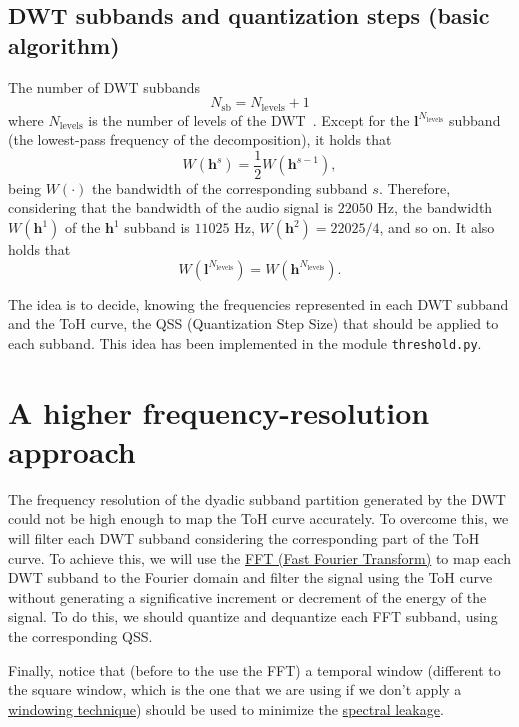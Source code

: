\subsection{DWT subbands and quantization steps (basic algorithm)}
The number of DWT subbands
\begin{equation}
  N_{\text{sb}} = N_{\text{levels}} + 1
\end{equation}
where $N_{\text{levels}}$ is the number of levels of the
DWT~\cite{vetterli1995wavelets}. Except for the
${\mathbf l}^{N_{\text{levels}}}$ subband (the lowest-pass frequency
of the decomposition), it holds that
\begin{equation}
  W({\mathbf h}^s) = \frac{1}{2}W({\mathbf h}^{s-1}),
\end{equation}
being $W(\cdot)$ the bandwidth of the corresponding
subband $s$. Therefore, considering that the bandwidth of the audio signal
is $22050$ Hz, the bandwidth $W({\mathbf h}^1)$ of the ${\mathbf h}^1$ subband is $11025$ Hz,
$W({\mathbf h} ^2)=22025/4$, and so on. It also holds that
\begin{equation}
  W({\mathbf l}^{N_{\text{levels}}}) = W({\mathbf h}^{N_{\text{levels}}}).
\end{equation}

The idea is to decide, knowing the frequencies represented in each DWT
subband and the ToH curve, the QSS (Quantization Step Size) that should be
applied to each subband. This idea has been implemented in the module
\verb|threshold.py|.

\section{A higher frequency-resolution approach}

The frequency resolution of the dyadic subband partition generated by
the DWT could not be high enough to map the ToH curve accurately. To
overcome this, we will filter each DWT subband considering the
corresponding part of the ToH curve. To achieve this, we will use the
\href{https://numpy.org/doc/stable/reference/routines.fft.html}{FFT
  (Fast Fourier Transform)} to map each DWT subband to the Fourier
domain and filter the signal using the ToH curve without generating a
significative increment or decrement of the energy of the signal. To
do this, we should quantize and dequantize each FFT subband, using the
corresponding QSS.

Finally, notice that (before to the use the FFT) a temporal window
(different to the square window, which is the one that we are using if
we don't apply a
\href{https://en.wikipedia.org/wiki/Window_function}{windowing
  technique}) should be used to minimize the
\href{https://en.wikipedia.org/wiki/Spectral_leakage}{spectral
  leakage}.

